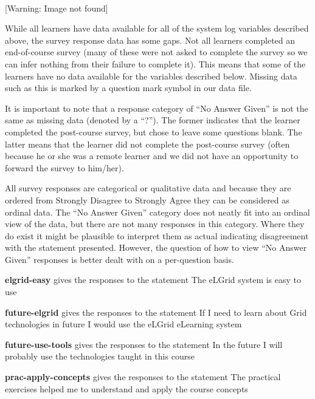 \documentclass[12pt,twoside]{article}
\begin{document}
~ 

 [Warning: Image not found]  

\bigskip

While all learners have data available for all of the system log
variables described above, the survey response data has some gaps. Not
all learners completed an end{}-of{}-course survey (many of these were
not asked to complete the survey so we can infer nothing from their
failure to complete it). This means that some of the learners have no
data available for the variables described below. Missing data such as
this is marked by a question mark symbol in our data file. 

It is important to note that a response category of ``No Answer Given''
is not the same as missing data (denoted by a ``?''). The former
indicates that the learner completed the post{}-course survey, but
chose to leave some questions blank. The latter means that the learner
did not complete the post{}-course survey (often because he or she was
a remote learner and we did not have an opportunity to forward the
survey to him/her). 

All survey responses are categorical or qualitative data and because
they are ordered from Strongly Disagree to Strongly Agree they can be
considered as ordinal data. The ``No Answer Given'' category does not
neatly fit into an ordinal view of the data, but there are not many
responses in this category. Where they do exist it might be plausible
to interpret them as actual indicating disagreement with the statement
presented. However, the question of how to view ``No Answer Given''
responses is better dealt with on a per{}-question basis. 


\bigskip

\textbf{elgrid{}-easy} gives the responses to the statement
{\textquotedbl}The eLGrid system is easy to use{\textquotedbl} 

\textbf{future{}-elgrid} gives the responses to the statement
{\textquotedbl}If I need to learn about Grid technologies in future I
would use the eLGrid eLearning system{\textquotedbl} 

\textbf{future{}-use{}-tools} gives the responses to the statement
{\textquotedbl}In the future I will probably use the technologies
taught in this course{\textquotedbl} 

\textbf{prac{}-apply{}-concepts} gives the responses to the statement
{\textquotedbl}The practical exercises helped me to understand and
apply the course concepts{\textquotedbl} 
\end{document}
